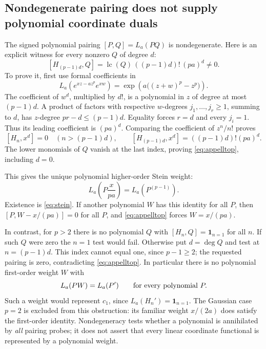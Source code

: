 \documentclass[11pt]{article}
\theoremstyle{remark}\newtheorem{remark}[theorem]{Remark}
\begin{document}
\subsection*{Nondegenerate pairing does not supply polynomial coordinate duals}
The signed polynomial pairing $[P,Q]=L_a(PQ)$ is nondegenerate.
Here is an explicit witness for every nonzero $Q$ of degree $d$:
\begin{equation}\label{eq:appelltop}
 [H_{(p-1)d},Q]
 =\operatorname{lc}(Q)\,((p-1)d)!\,(pa)^d\ne0.
\end{equation}
To prove it, first use formal coefficients in
\[
 L_a(e^{xz-az^p}e^{xw})
 =\exp\!\left(a\big((z+w)^p-z^p\big)\right).
\]
The coefficient of $w^d$, multiplied by $d!$, is a polynomial in
$z$ of degree at most $(p-1)d$. A product of factors with respective
$w$-degrees $j_1,\ldots,j_r\geq1$, summing to $d$, has $z$-degree
$pr-d\leq(p-1)d$. Equality forces $r=d$ and every $j_i=1$.
Thus its leading coefficient is $(pa)^d$. Comparing the coefficient
of $z^n/n!$ proves
\[
 [H_n,x^d]=0\quad(n>(p-1)d),\qquad
 [H_{(p-1)d},x^d]=((p-1)d)!(pa)^d.
\]
The lower monomials of $Q$ vanish at the last index, proving
\eqref{eq:appelltop}, including $d=0$.

This gives the unique polynomial higher-order Stein weight:
\[
 L_a\!\left(P\frac{x}{pa}\right)=L_a(P^{(p-1)}).
\]
Existence is \eqref{eq:stein}. If another polynomial $W$ has this
identity for all $P$, then $[P,W-x/(pa)]=0$ for all $P$, and
\eqref{eq:appelltop} forces $W=x/(pa)$.

In contrast, for $p>2$ there is no polynomial $Q$ with
$[H_n,Q]=\mathbf1_{n=1}$ for all $n$. If such $Q$ were zero the
$n=1$ test would fail. Otherwise put $d=\deg Q$ and test at
$n=(p-1)d$. This index cannot equal one, since $p-1\geq2$;
the requested pairing is zero, contradicting \eqref{eq:appelltop}.
In particular there is no polynomial first-order weight $W$ with
\begin{equation}\label{eq:nofirststein}
 L_a(PW)=L_a(P')\qquad\hbox{for every polynomial }P.
\end{equation}
Such a weight would represent $c_1$, since
$L_a(H_n')=\mathbf1_{n=1}$. The Gaussian case $p=2$ is excluded
from this obstruction: its familiar weight $x/(2a)$ does satisfy the
first-order identity. Nondegeneracy tests whether a polynomial is
annihilated by \emph{all} pairing probes; it does not assert that every
linear coordinate functional is represented by a polynomial weight.
\end{document}
